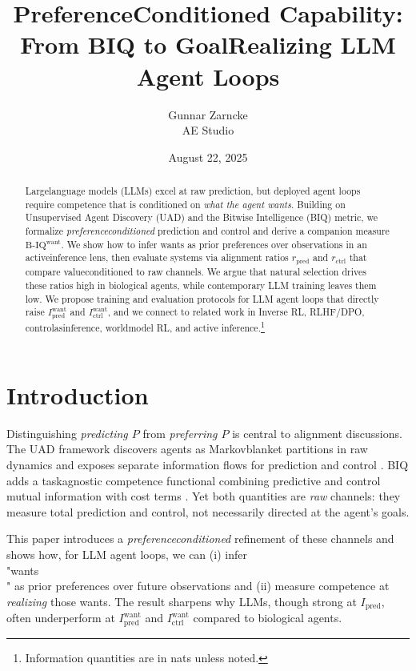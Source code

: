 \documentclass[11pt]{article}
\title{Preference\textendash Conditioned Capability: From B\textendash IQ to Goal\textendash Realizing LLM Agent Loops}
\author{Gunnar Zarncke\\AE Studio}
\date{August 22, 2025}
\begin{document}
\maketitle
\begin{abstract}
\noindent
Large\textendash language models (LLMs) excel at raw prediction, but deployed agent loops require competence that is conditioned on \emph{what the agent wants}. Building on Unsupervised Agent Discovery (UAD) and the Bitwise Intelligence (B\textendash IQ) metric, we formalize \emph{preference\textendash conditioned} prediction and control and derive a companion measure $\mathrm{B\text{-}IQ}^{\text{want}}$. We show how to infer wants as prior preferences over observations in an active\textendash inference lens, then evaluate systems via alignment ratios $r_{\mathrm{pred}}$ and $r_{\mathrm{ctrl}}$ that compare value\textendash conditioned to raw channels. We argue that natural selection drives these ratios high in biological agents, while contemporary LLM training leaves them low. We propose training and evaluation protocols for LLM agent loops that directly raise $I^{\text{want}}_{\mathrm{pred}}$ and $I^{\text{want}}_{\mathrm{ctrl}}$, and we connect to related work in Inverse RL, RLHF/DPO, control\textendash as\textendash inference, world\textendash model RL, and active inference.\footnote{Information quantities are in nats unless noted.}
\end{abstract}

\section{Introduction}
Distinguishing \emph{predicting $P$} from \emph{preferring $P$} is central to alignment discussions. The UAD framework discovers agents as Markov\textendash blanket partitions in raw dynamics and exposes separate information flows for prediction and control \citep{ZarnckeUAD}. B\textendash IQ adds a task\textendash agnostic competence functional combining predictive and control mutual information with cost terms \citep{ZarnckeBIQ}. Yet both quantities are \emph{raw} channels: they measure total prediction and control, not necessarily directed at the agent's goals.

This paper introduces a \emph{preference\textendash conditioned} refinement of these channels and shows how, for LLM agent loops, we can (i) infer \\"wants\\" as prior preferences over future observations and (ii) measure competence at \emph{realizing} those wants. The result sharpens why LLMs, though strong at $I_{\mathrm{pred}}$, often underperform at $I^{\text{want}}_{\mathrm{pred}}$ and $I^{\text{want}}_{\mathrm{ctrl}}$ compared to biological agents.
\end{document}
